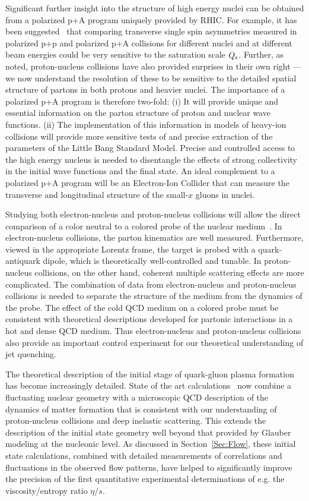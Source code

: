 Significant further insight into the structure of high energy nuclei
can be obtained from a polarized p+A program uniquely provided by RHIC\cite{Aschenauer:2015eha}.  
For example, it has been 
suggested~\cite{Kang:2011ni,Kovchegov:2013cva}
that comparing transverse single spin asymmetries measured in polarized p+p
and polarized p+A collisions for different nuclei and at different beam
energies could be very sensitive to the saturation scale $Q_{\mathrm{s}}$.
Further, as noted, proton-nucleus collisions have also provided surprises in their own right --- we now understand the resolution of these to be sensitive to the detailed spatial structure of partons in both protons and heavier nuclei. 
The importance of a polarized p+A program is therefore two-fold: (i) It will provide unique and essential information on the parton structure of proton and nuclear wave functions. (ii) The  implementation of this information in models of heavy-ion collisions will provide more sensitive  tests of and precise extraction of the parameters of the Little Bang Standard Model.
Precise and controlled access
to the high energy nucleus is needed to disentangle the effects of
strong collectivity in the initial wave functions and the final
state. An ideal complement to a polarized p+A program will be an Electron-Ion 
Collider that can measure the transverse and longitudinal 
structure of the small-$x$ gluons in nuclei.

Studying both electron-nucleus and proton-nucleus collisions will allow the direct comparison 
of a color neutral to a colored probe of the nuclear medium~\cite{Accardi:2012qut}.
In electron-nucleus collisions,
the parton kinematics are well measured. Furthermore, viewed in the appropriate
Lorentz frame,  the target is probed with a quark-antiquark dipole, which is 
theoretically well-controlled and tunable.
In proton-nucleus collisions, on the other hand, coherent multiple scattering effects
are more complicated.
The combination of data from electron-nucleus and proton-nucleus collisions
is needed to separate
the structure of the medium from the dynamics of the probe. 
The effect of the cold QCD medium on a colored probe must be consistent with theoretical
descriptions developed for partonic interactions in a hot and dense QCD medium.
Thus electron-nucleus and proton-nucleus collisions also 
provide an important control experiment for our theoretical understanding of jet quenching.


The theoretical description of the initial stage of quark-gluon plasma formation has become 
increasingly detailed. State of the art calculations~\cite{Gale:2012rq,Paatelainen:2013eea} 
now combine a 
fluctuating nuclear geometry with a microscopic QCD description of the dynamics of matter
formation that is consistent with our understanding of proton-nucleus collisions 
and deep inelastic scattering. This 
extends the description of the initial state geometry well beyond that provided
by Glauber modeling at the nucleonic level. As discussed in Section~\ref{Sec:Flow}, these initial state 
calculations, combined with detailed measurements of correlations and fluctuations in the
observed flow patterns, have 
helped 
to significantly improve the precision of the first quantitative experimental 
determinations of e.g. the viscosity/entropy ratio $\eta/s$. 

